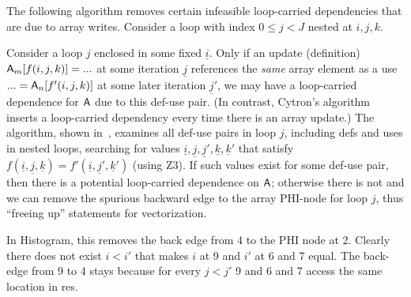 The following algorithm removes certain infeasible loop-carried dependencies that are due to array writes. Consider a loop with index $0 \le j < J$
nested at $i,j,k$. 
\begin{comment}
\begin{algorithmic}
\FOR {each array ${\sf A}$ written in loop $j$}
\STATE \COMMENT { including enclosed loops in $j$ }
\STATE dep = False
\FOR {each pair def: ${\sf A}_m[f(i,j,k)] = ... $, and use: $ ... = {\sf A}_n[f'(i,j,k)]$ in loop $j$}
\IF {$\exists \underline{i}, \underline{j}, \underline{j}', \underline{k}, \underline{k}'$, s.t. $0\! \le\! \underline{i}\! <\! I,\: 0\! \le\! \underline{j}, \underline{j}' \! <\! J,\: 0\! \le\! \underline{k}, \underline{k}' \! <\! K,\: \underline{j}<\underline{j}'$, and $f(\underline{i},\underline{j},\underline{k}) = f'(\underline{i},\underline{j}',\underline{k}')$}
\STATE dep = True
\ENDIF
\ENDFOR
\IF {dep == False}
\STATE remove back edge into ${\sf A}$'s $\phi$-node in loop $j$.
\ENDIF
\ENDFOR
\end{algorithmic}
\end{comment}
Consider a loop $j$ enclosed in some fixed $\underline{i}$. Only if an update (definition) ${\sf A}_m[f(i,j,k)] = ... $ at some iteration $\underline{j}$
references the \emph{same} array element as a use $ ... = {\sf A}_n[f'(i,j,k)]$ at some later iteration $\underline{j}'$,
we may have a loop-carried dependence for ${\sf A}$ due to this def-use pair. (In contrast, Cytron's algorithm inserts a loop-carried dependency every time there is an array update.)
The algorithm, shown in~\cite{Anon_TR}, examines all def-use pairs in loop $j$, including defs and uses in nested loops, 
searching for values $\underline{i}, \underline{j}, \underline{j}', \underline{k}, \underline{k}'$ that satisfy
$f(\underline{i},\underline{j},\underline{k}) = f'(\underline{i},\underline{j}',\underline{k}')$ (using Z3). If such values exist for some def-use pair, then there is a potential
loop-carried dependence on ${\sf A}$; otherwise there is not and we can remove the spurious backward edge to the array PHI-node 
for loop $j$, thus ``freeing up'' statements for vectorization. %

In Histogram, this removes the back edge from 4 to the PHI node at 2. Clearly there does not exist $i < i'$ that makes
$i$ at 9 and $i'$ at 6 and 7 equal. The back-edge from 9 to 4 stays because for every $j < j'$ 9 and 6 and 7 access the same location in {\sf res}. %

